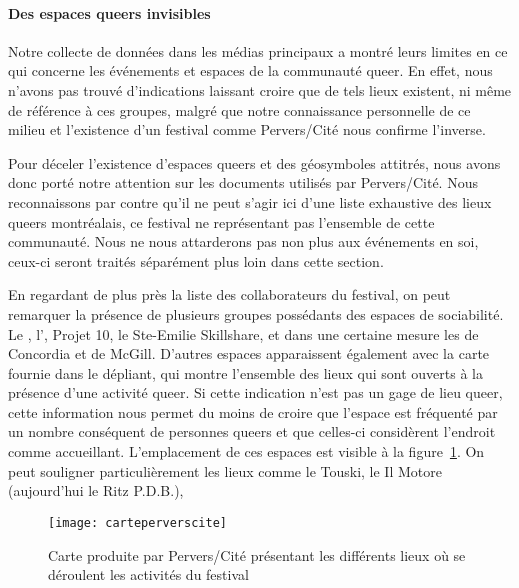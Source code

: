 \paragraph{Des espaces queers  invisibles}
Notre collecte de données dans les médias principaux a montré leurs limites en ce qui concerne les événements et espaces de la communauté queer.
En effet, nous n'avons pas trouvé d'indications laissant croire que de tels lieux existent, ni même de référence à ces groupes, malgré que notre connaissance personnelle de ce milieu et l'existence d'un festival comme Pervers/Cité nous confirme l'inverse.

Pour déceler l'existence d'espaces queers et des géosymboles attitrés, nous avons donc porté notre attention sur les documents utilisés par Pervers/Cité.
Nous reconnaissons par contre qu'il ne peut s'agir ici d'une liste exhaustive des lieux queers montréalais, ce festival ne représentant pas l'ensemble de cette communauté.
Nous ne nous attarderons pas non plus aux événements en soi, ceux-ci seront traités séparément plus loin dans cette section.

En regardant de plus près la liste des collaborateurs du festival, on peut remarquer la présence de plusieurs groupes possédants  des espaces de sociabilité.
Le \alccva, l'\astteq, Projet 10, le Ste-Emilie Skillshare, et dans une certaine mesure les \grip de Concordia et de McGill.
D'autres espaces apparaissent également avec la carte fournie dans le dépliant, qui montre l'ensemble des lieux qui sont ouverts à la présence d'une activité queer.
Si cette indication n'est pas un gage de lieu queer, cette information nous permet du moins de croire que l'espace est fréquenté par un nombre conséquent de personnes queers et que celles-ci considèrent l'endroit comme accueillant.
L'emplacement de ces espaces est visible à la figure~\ref{fig:carteperverscite}.
On peut souligner particulièrement les lieux comme le Touski, le Il Motore (aujourd'hui le Ritz P.D.B.),

\begin{figure}[h]
  \centering
  \texttt{[image: carteperverscite]}
  \caption[Carte des activités de Pervers/Cité]{Carte produite par Pervers/Cité présentant les différents lieux où se déroulent les activités du festival}\label{fig:carteperverscite}
  \source{\agq{}}
\end{figure}

